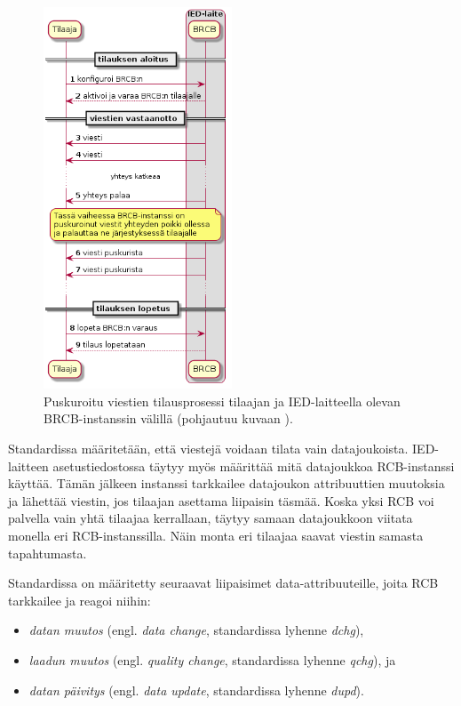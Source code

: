 \begin{figure}[ht!]
	\includegraphics[width=0.5\textwidth]{pictures/iec61850-brcb-communication.png}
	\caption{Puskuroitu viestien tilausprosessi tilaajan ja IED-laitteella olevan BRCB-instanssin välillä (pohjautuu kuvaan \mbox{\cite[s.~42]{IEC61850-7-1}}).}
	\label{fig:iec61850-brcb-communication}
\end{figure}

Standardissa määritetään, että viestejä voidaan tilata vain datajoukoista. IED-laitteen asetustiedostossa täytyy myös määrittää mitä datajoukkoa RCB-instanssi käyttää. Tämän jälkeen instanssi tarkkailee datajoukon attribuuttien muutoksia ja lähettää viestin, jos tilaajan asettama liipaisin täsmää. Koska yksi RCB voi palvella vain yhtä tilaajaa kerrallaan, täytyy samaan datajoukkoon viitata monella eri RCB-instanssilla. Näin monta eri tilaajaa saavat viestin samasta tapahtumasta. \mbox{\cite[s.~93]{IEC61850-7-2}}

Standardissa on määritetty seuraavat liipaisimet data-attribuuteille, joita RCB tarkkailee ja reagoi niihin:
\begin{itemize}
	\item \emph{datan muutos} (engl. \emph{data change}, standardissa lyhenne \emph{dchg}),
	\item \emph{laadun muutos} (engl. \emph{quality change}, standardissa lyhenne \emph{qchg}), ja
	\item \emph{datan päivitys} (engl. \emph{data update}, standardissa lyhenne \emph{dupd}).
\end{itemize}

